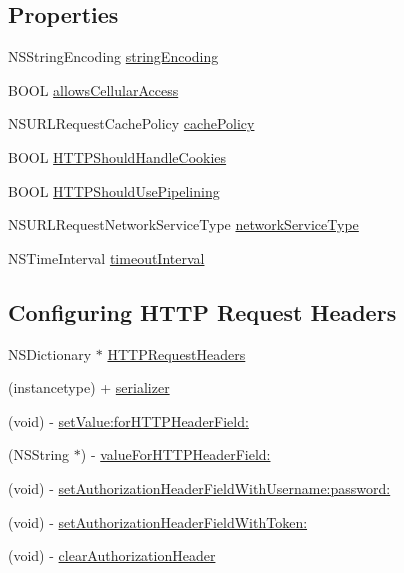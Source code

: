 \subsection*{Properties}
\begin{DoxyCompactItemize}
\item 
N\+S\+String\+Encoding \hyperlink{interface_a_f_h_t_t_p_request_serializer_adbc30f08c984b2ca0922d871bf625d8f}{string\+Encoding}
\item 
B\+O\+O\+L \hyperlink{interface_a_f_h_t_t_p_request_serializer_ad1e2a4f25d1f250c8a702c3b0d9e6a8b}{allows\+Cellular\+Access}
\item 
N\+S\+U\+R\+L\+Request\+Cache\+Policy \hyperlink{interface_a_f_h_t_t_p_request_serializer_ace509f9a4a7798cee965d6d0939196a7}{cache\+Policy}
\item 
B\+O\+O\+L \hyperlink{interface_a_f_h_t_t_p_request_serializer_a87ed9e46c52d429016869a7d2bc46b97}{H\+T\+T\+P\+Should\+Handle\+Cookies}
\item 
B\+O\+O\+L \hyperlink{interface_a_f_h_t_t_p_request_serializer_aff714e6d87d3063daa6ba8c5e504ec4e}{H\+T\+T\+P\+Should\+Use\+Pipelining}
\item 
N\+S\+U\+R\+L\+Request\+Network\+Service\+Type \hyperlink{interface_a_f_h_t_t_p_request_serializer_a5606b2650ff3860a4ae94ea06f2b1d9c}{network\+Service\+Type}
\item 
N\+S\+Time\+Interval \hyperlink{interface_a_f_h_t_t_p_request_serializer_aaf4bf60cd1896ade2788764892496812}{timeout\+Interval}
\end{DoxyCompactItemize}
\subsection*{Configuring H\+T\+T\+P Request Headers}
\label{_amgrpffb4931d6fbb854a997b29c058459123}%


 

 \begin{DoxyCompactItemize}
\item 
N\+S\+Dictionary $\ast$ \hyperlink{interface_a_f_h_t_t_p_request_serializer_a8ea98a933795e97a771f4b5a82a637c2}{H\+T\+T\+P\+Request\+Headers}
\item 
(instancetype) + \hyperlink{interface_a_f_h_t_t_p_request_serializer_acfa41b7617090479b4ad92edcf8451d7}{serializer}
\item 
(void) -\/ \hyperlink{interface_a_f_h_t_t_p_request_serializer_a53e67d498dbe4df0fb7e28f84d76fa8f}{set\+Value\+:for\+H\+T\+T\+P\+Header\+Field\+:}
\item 
(N\+S\+String $\ast$) -\/ \hyperlink{interface_a_f_h_t_t_p_request_serializer_ad3772ba3e52f7d71a2a08f2b3c113721}{value\+For\+H\+T\+T\+P\+Header\+Field\+:}
\item 
(void) -\/ \hyperlink{interface_a_f_h_t_t_p_request_serializer_a3fe6f46d9d9590803d63a083da2147d6}{set\+Authorization\+Header\+Field\+With\+Username\+:password\+:}
\item 
(void) -\/ \hyperlink{interface_a_f_h_t_t_p_request_serializer_aa7426bb8422c203a0aeb17f8c04ff8e6}{set\+Authorization\+Header\+Field\+With\+Token\+:}
\item 
(void) -\/ \hyperlink{interface_a_f_h_t_t_p_request_serializer_a211e5d5ca44cd3f2fe0e1f1deeb9ef17}{clear\+Authorization\+Header}
\end{DoxyCompactItemize}
